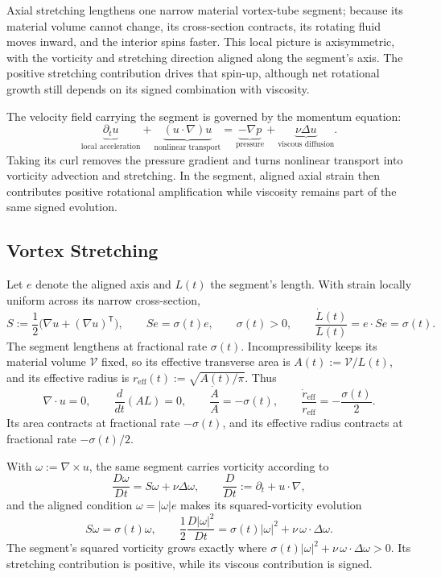 
Axial stretching lengthens one narrow material vortex-tube segment; because its material volume cannot change, its cross-section contracts, its rotating fluid moves inward, and the interior spins faster. This local picture is axisymmetric, with the vorticity and stretching direction aligned along the segment's axis. The positive stretching contribution drives that spin-up, although net rotational growth still depends on its signed combination with viscosity.

The velocity field carrying the segment is governed by the momentum equation:
\[
  \underbrace{\partial_t u}_{\text{local acceleration}}
  +
  \underbrace{(u\cdot\nabla)u}_{\text{nonlinear transport}}
  =
  \underbrace{-\nabla p}_{\text{pressure}}
  +
  \underbrace{\nu\Delta u}_{\text{viscous diffusion}}.
\]
Taking its curl removes the pressure gradient and turns nonlinear transport into vorticity advection and stretching. In the segment, aligned axial strain then contributes positive rotational amplification while viscosity remains part of the same signed evolution.

\subsection{Vortex Stretching}\label{sub:ThePerfectlyStretchingVortex}

Let \(e\) denote the aligned axis and \(L(t)\) the segment's length. With strain locally uniform across its narrow cross-section,
\[
  S:=\frac12\bigl(\nabla u+(\nabla u)^{\mathsf T}\bigr),
  \qquad
  Se=\sigma(t)e,
  \qquad
  \sigma(t)>0,
  \qquad
  \frac{\dot L(t)}{L(t)}
  =
  e\cdot Se
  =
  \sigma(t).
\]
The segment lengthens at fractional rate \(\sigma(t)\). Incompressibility keeps its material volume \(\mathcal V\) fixed, so its effective transverse area is \(A(t):=\mathcal V/L(t)\), and its effective radius is \(r_{\mathrm{eff}}(t):=\sqrt{A(t)/\pi}\). Thus
\[
  \nabla\cdot u=0,
  \qquad
  \frac{d}{dt}(A L)=0,
  \qquad
  \frac{\dot A}{A}=-\sigma(t),
  \qquad
  \frac{\dot r_{\mathrm{eff}}}{r_{\mathrm{eff}}}
  =
  -\frac{\sigma(t)}{2}.
\]
Its area contracts at fractional rate \(-\sigma(t)\), and its effective radius contracts at fractional rate \(-\sigma(t)/2\).

With \(\omega:=\nabla\times u\), the same segment carries vorticity according to
\[
  \frac{D\omega}{Dt}
  =
  S\omega+\nu\Delta\omega,
  \qquad
  \frac{D}{Dt}
  :=
  \partial_t+u\cdot\nabla,
\]
and the aligned condition \(\omega=|\omega|e\) makes its squared-vorticity evolution
\[
  S\omega
  =
  \sigma(t)\omega,
  \qquad
  \frac12\frac{D|\omega|^2}{Dt}
  =
  \sigma(t)|\omega|^2
  +
  \nu\,\omega\cdot\Delta\omega.
\]
The segment's squared vorticity grows exactly where \(\sigma(t)|\omega|^2+\nu\,\omega\cdot\Delta\omega>0\). Its stretching contribution is positive, while its viscous contribution is signed.

